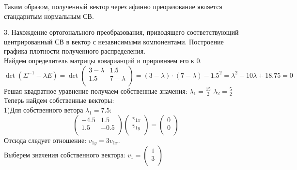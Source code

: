 \documentclass{article}
\begin{document}
Таким образом, полученный вектор через афинно преоразование является стандарнтым нормальным СВ. \newpage

3. Нахождение ортогонального преобразования, приводящего соответствующий центрированный СВ в вектор с независимыми компонентами. Построение графика плотности полученного распределения.\\

Найдем определитель матрицы коварианций и прировняем его к 0.\\

$\det(\Sigma^{-1}-\lambda E)=
\det
\left(
  	{\begin{array}{cc}
    		3-\lambda & 1.5\\
    		1.5 & 7-\lambda\\
  	\end{array}}
\right)
= (3-\lambda)\cdot(7-\lambda)-1.5^2=\lambda^2-10\lambda+18.75=0$\\

Решая квадратное уравнение получаем собственные значения:
$\lambda_{1}=\frac{15}{2}$
$\lambda_{2}=\frac{5}{2}$\\

Теперь найдем собственные векторы:\\

1)Для собственного ветора $\lambda_{1}=7.5$:\\

$$\left(
  	{\begin{array}{cc}
    		-4.5 & 1.5\\
    		1.5 & -0.5\\
  	\end{array}}
\right)
\left(
  	{\begin{array}{c}
    		v_{1x}\\
    		v_{1y}\\
  	\end{array}}
\right)=
\left(
  	{\begin{array}{c}
    		0\\
    		0\\
  	\end{array}}
\right)
$$
Отсюда следует отношение: $v_{1y}=3v_{1x}$.\\
Выберем значения собственного вектора:
$v_{1}=\left(
  	{\begin{array}{c}
    		1\\
    		3\\
  	\end{array}}
\right)$\\
\end{document}
